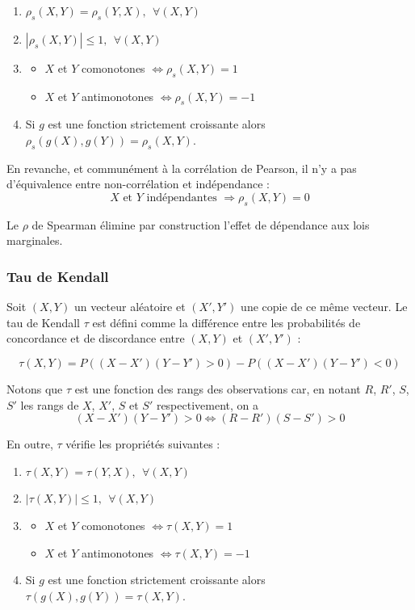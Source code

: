\begin{enumerate}

\item $\rho_s(X,Y) = \rho_s(Y,X), ~~\forall (X,Y)$
\item $|\rho_s(X,Y)| \leq 1, ~~\forall (X,Y)$
\item 
\begin{itemize}
\item $X$ et $Y$ comonotones $\Longleftrightarrow \rho_s(X,Y)=1$
\item $X$ et $Y$ antimonotones $\Longleftrightarrow \rho_s(X,Y)=-1$
\end{itemize}
\item Si $g$ est une fonction strictement croissante alors $\rho_s(g(X),g(Y))=\rho_s(X,Y)$.

\end{enumerate}

En revanche, et communément à la corrélation de Pearson, il n’y a pas d’équivalence entre non-corrélation et indépendance :
$$
X \text{~et~} Y \text{~indépendantes~} \Longrightarrow \rho_s(X,Y) = 0
$$
	
Le $\rho$ de Spearman élimine par construction l’effet de dépendance aux lois marginales.


\subsubsection{Tau de Kendall}

Soit $(X,Y)$ un vecteur aléatoire et $(X',Y')$ une copie de ce même vecteur. Le tau de Kendall $\tau$ est défini
comme la différence  entre les probabilités de concordance et de discordance entre $(X,Y)$ et $(X',Y')$ :

$$
\tau(X,Y) = P\left( (X-X')(Y-Y') >0 \right) - P\left( (X-X')(Y-Y') <0 \right)
$$

Notons que $\tau$ est une fonction des rangs des observations car, en notant $R$, $R'$, $S$, $S'$ les rangs de $X$, $X'$, $S$ et $S'$ respectivement, on a 
$$
(X-X')(Y-Y') >0 \Longleftrightarrow (R-R')(S-S') >0 
$$

En outre, $\tau$ vérifie les propriétés suivantes :

\begin{enumerate}

\item $\tau(X,Y) = \tau(Y,X), ~~\forall (X,Y)$
\item $|\tau(X,Y)| \leq 1, ~~\forall (X,Y)$
\item 
\begin{itemize}
\item $X$ et $Y$ comonotones $\Longleftrightarrow \tau(X,Y)=1$
\item $X$ et $Y$ antimonotones $\Longleftrightarrow \tau(X,Y)=-1$
\end{itemize}
\item Si $g$ est une fonction strictement croissante alors $\tau(g(X),g(Y))=\tau(X,Y)$.
\end{enumerate}


